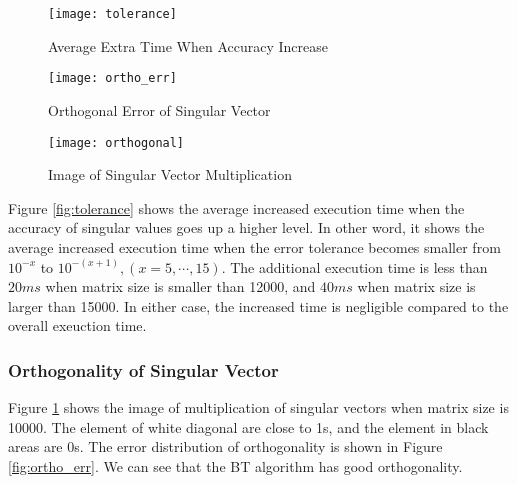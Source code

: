 \begin{figure}[hbpt]
\vspace{-0.3in}
\begin{minipage}[t]{0.33\linewidth}
\centering
\texttt{[image: tolerance]}
\vspace{-0.1in}
\caption{Average Extra Time When Accuracy Increase}
\label{fig:tolerance}
\end{minipage}%
\begin{minipage}[t]{0.33\linewidth}
\centering
\texttt{[image: ortho\_err]}
\vspace{-0.1in}
\caption{Orthogonal Error of Singular Vector}
\label{fig:ortho_err}
\end{minipage}
\begin{minipage}[t]{0.33\linewidth}
\centering
\texttt{[image: orthogonal]}
\vspace{-0.1in}
\caption{Image of Singular Vector Multiplication}
\label{fig:ortho_img}
\end{minipage}
\vspace{-0.2in}
\end{figure}
Figure \ref{fig:tolerance} shows the average increased execution time when the accuracy of singular values goes up a higher level.
In other word, it shows the average increased execution time when the error tolerance becomes smaller from $10^{-x}$ to $10^{-(x+1)}, (x=5,\cdots,15)$.
The additional execution time is less than $20 ms$ when matrix size is smaller than 12000, and $40 ms$ when matrix size is larger than 15000.
In either case, the increased time is negligible compared to the overall exeuction time.

\vspace{-0.1in}
\subsubsection{Orthogonality of Singular Vector}
\vspace{-0.1in}
Figure \ref{fig:ortho_img} shows the image of multiplication of singular vectors when matrix size is 10000.
The element of white diagonal are close to 1s, and the element in black areas are 0s.
The error distribution of orthogonality is shown in Figure \ref{fig:ortho_err}. We can see that the BT algorithm has good orthogonality.
